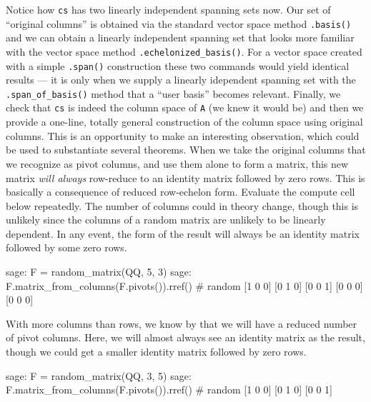 %
Notice how \verb?cs? has two linearly independent spanning sets now.  Our set of ``original columns'' is obtained via the standard vector space method \verb?.basis()? and we can obtain a linearly independent spanning set that looks more familiar with the vector space method \verb?.echelonized_basis()?.  For a vector space created with a simple \verb?.span()? construction these two commands would yield identical results --- it is only when we supply a linearly idependent spanning set with the \verb?.span_of_basis()? method that a ``user basis'' becomes relevant.
%
Finally, we check that \verb?cs? is indeed the column space of \verb?A? (we knew it would be) and then we provide a one-line, totally general construction of the column space using original columns.
%
This is an opportunity to make an interesting observation, which could be used to substantiate several theorems.  When we take the original columns that we recognize as pivot columns, and use them alone to form a matrix, this new matrix \emph{will always} row-reduce to an identity matrix followed by zero rows.  This is basically a consequence of reduced row-echelon form.  Evaluate the compute cell below repeatedly.  The number of columns could in theory change, though this is unlikely since the columns of a random matrix are unlikely to be linearly dependent.  In any event, the form of the result will always be an identity matrix followed by some zero rows.
%
\begin{sageexample}
sage: F = random_matrix(QQ, 5, 3)
sage: F.matrix_from_columns(F.pivots()).rref()   # random
[1 0 0]
[0 1 0]
[0 0 1]
[0 0 0]
[0 0 0]
\end{sageexample}
%
With more columns than rows, we know by  that we will have a reduced number of pivot columns.  Here, we will almost always see an identity matrix as the result, though we could get a smaller identity matrix followed by zero rows.
%
\begin{sageexample}
sage: F = random_matrix(QQ, 3, 5)
sage: F.matrix_from_columns(F.pivots()).rref()   # random
[1 0 0]
[0 1 0]
[0 0 1]
\end{sageexample}
%
\begin{sageverbatim}
\end{sageverbatim}
%









